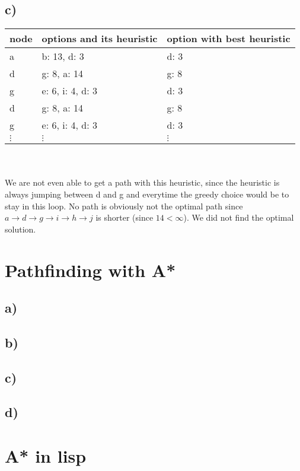 \documentclass[12pt,a4paper]{scrartcl}
\begin{document}
\subsection*{c)}
	\begin{tabular}{l | l | l   }
		node & options and its heuristic & option with best heuristic \\ \hline
		a & b: 13, d: 3 & d: 3 \\
		d & g: 8, a: 14 & g: 8 \\
		g & e: 6, i: 4, d: 3 & d: 3 \\
		d & g: 8, a: 14 & g: 8 \\
		g & e: 6, i: 4, d: 3 & d: 3 \\
		$\vdots$ & $\vdots$ & $\vdots$ \\
	\end{tabular}\\ \\
	We are not even able to get a path with this heuristic, since the heuristic is always jumping between d and g and everytime the greedy choice would be to stay in this loop. 
	No path is obviously not the optimal path since $a \rightarrow d \rightarrow g \rightarrow i \rightarrow h \rightarrow j$ is shorter (since $14 < \infty$). We did not find the optimal solution.
\section{Pathfinding with A*}
\subsection*{a)}
\subsection*{b)}
\subsection*{c)}
\subsection*{d)}
\section{A* in lisp}
	
\end{document}
